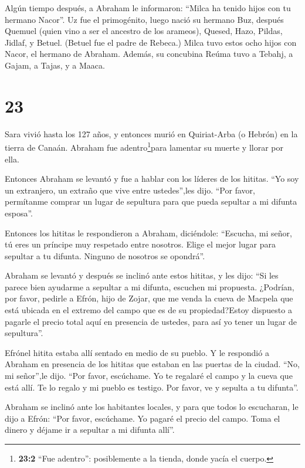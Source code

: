  Algún tiempo después, a Abraham le informaron: ``Milca ha
tenido hijos con tu hermano Nacor''.  Uz fue el
primogénito, luego nació su hermano Buz, después Quemuel (quien vino a
ser el ancestro de los arameos),  Quesed, Hazo, Pildas,
Jidlaf, y Betuel.  (Betuel fue el padre de Rebeca.) Milca
tuvo estos ocho hijos con Nacor, el hermano de Abraham. 
Además, su concubina Reúma tuvo a Tebahj, a Gajam, a Tajas, y a Maaca.

\hypertarget{section-22}{%
\section{23}\label{section-22}}

 Sara vivió hasta los 127 años,  y entonces
murió en Quiriat-Arba (o Hebrón) en la tierra de Canaán. Abraham fue
adentro\footnote{\textbf{23:2} ``Fue adentro'': posiblemente a la
  tienda, donde yacía el cuerpo.}para lamentar su muerte y llorar por
ella.

 Entonces Abraham se levantó y fue a hablar con los líderes
de los hititas.  ``Yo soy un extranjero, un extraño que vive
entre ustedes'',les dijo. ``Por favor, permítanme comprar un lugar de
sepultura para que pueda sepultar a mi difunta esposa''.

 Entonces los hititas le respondieron a Abraham, diciéndole:
 ``Escucha, mi señor, tú eres un príncipe muy respetado
entre nosotros. Elige el mejor lugar para sepultar a tu difunta. Ninguno
de nosotros se opondrá''.

 Abraham se levantó y después se inclinó ante estos hititas,
 y les dijo: ``Si les parece bien ayudarme a sepultar a mi
difunta, escuchen mi propuesta. ¿Podrían, por favor, pedirle a Efrón,
hijo de Zojar,  que me venda la cueva de Macpela que está
ubicada en el extremo del campo que es de su propiedad?Estoy dispuesto a
pagarle el precio total aquí en presencia de ustedes, para así yo tener
un lugar de sepultura''.

 Efrónel hitita estaba allí sentado en medio de su pueblo.
Y le respondió a Abraham en presencia de los hititas que estaban en las
puertas de la ciudad.  ``No, mi señor'',le dijo. ``Por
favor, escúchame. Yo te regalaré el campo y la cueva que está allí. Te
lo regalo y mi pueblo es testigo. Por favor, ve y sepulta a tu
difunta''.

 Abraham se inclinó ante los habitantes locales,
 y para que todos lo escucharan, le dijo a Efrón: ``Por
favor, escúchame. Yo pagaré el precio del campo. Toma el dinero y déjame
ir a sepultar a mi difunta allí''.

